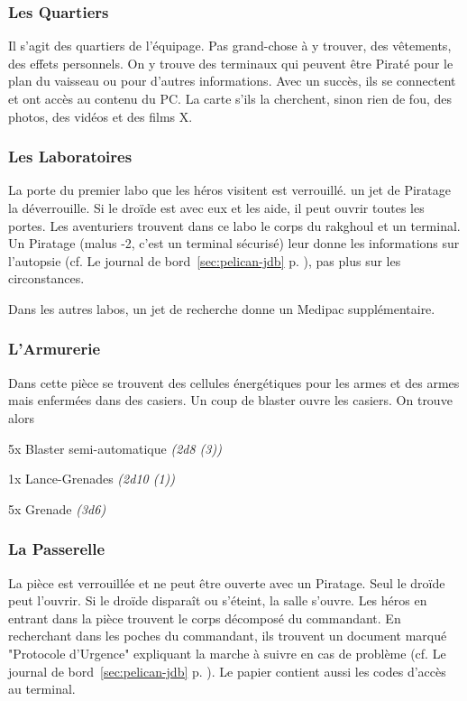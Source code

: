 \subsubsection{Les Quartiers}
Il s’agit des quartiers de l’équipage. Pas grand-chose à y trouver, des vêtements, des effets personnels. On y trouve des terminaux qui peuvent être Piraté pour le plan du vaisseau ou pour d’autres informations. Avec un succès, ils se connectent et ont accès au contenu du PC. La carte s’ils la cherchent, sinon rien de fou, des photos, des vidéos et des films X.

\subsubsection{Les Laboratoires}
La porte du premier labo que les héros visitent est verrouillé. un jet de Piratage la déverrouille. Si le droïde est avec eux et les aide, il peut ouvrir toutes les portes. Les aventuriers trouvent dans ce labo le corps du rakghoul et un terminal. Un Piratage (malus -2, c’est un terminal sécurisé) leur donne les informations sur l’autopsie (cf. Le journal de bord~\ref{sec:pelican-jdb} p. \pageref{sec:pelican-jdb}), pas plus sur les circonstances.

Dans les autres labos, un jet de recherche donne un Medipac supplémentaire.

\subsubsection{L’Armurerie}
Dans cette pièce se trouvent des cellules énergétiques pour les armes et des armes mais enfermées dans des casiers. Un coup de blaster ouvre les casiers. On trouve alors 
\begin{rebelist}
	\item 5x Blaster semi-automatique \emph{(2d8 (3))}
	\item 1x Lance-Grenades \emph{(2d10 (1))}
	\item 5x Grenade \emph{(3d6)}
\end{rebelist}

\subsubsection{La Passerelle}
La pièce est verrouillée et ne peut être ouverte avec un Piratage. Seul le droïde peut l’ouvrir. Si le droïde disparaît ou s’éteint, la salle s’ouvre. Les héros en entrant dans la pièce trouvent le corps décomposé du commandant. En recherchant dans les poches du commandant, ils trouvent un document marqué "Protocole d’Urgence" expliquant la marche à suivre en cas de problème (cf. Le journal de bord~\ref{sec:pelican-jdb} p. \pageref{sec:pelican-jdb}). Le papier contient aussi les codes d’accès au terminal.

